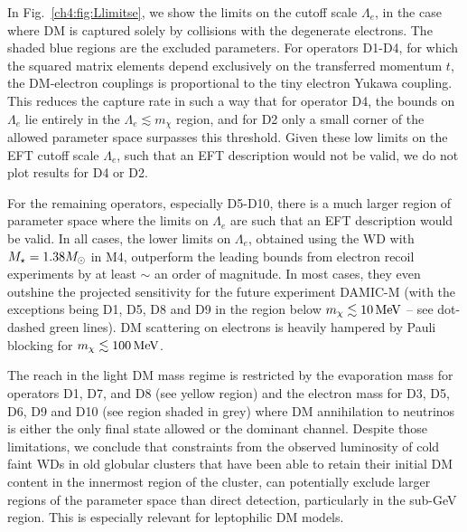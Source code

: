 In Fig.~\ref{ch4:fig:Llimitse}, we show the limits on the cutoff scale $\Lambda_e$, in the case where DM is captured solely by collisions with the degenerate electrons. The shaded blue regions are the excluded parameters.
For operators D1-D4, for which the squared matrix elements
depend exclusively on the transferred momentum $t$, the DM-electron couplings is proportional to the tiny electron Yukawa coupling. 
This reduces the capture rate in such a way that for operator D4, the bounds on $\Lambda_e$ lie entirely in the $\Lambda_e \lesssim m_\chi$ region, and for D2 only a small corner of the allowed parameter space surpasses this threshold. Given these low limits on the EFT cutoff scale $\Lambda_e$, such that an EFT description would not be valid, we do not plot results for D4 or D2.

For the remaining operators, especially D5-D10, there is a much larger region of parameter space where the limits on $\Lambda_e$ are such that an EFT description would be valid. In all cases, the lower limits on $\Lambda_e$, obtained using the WD with $M_\star=1.38M_\odot$ in M4, outperform the leading bounds from electron recoil experiments by at least $\sim$ an order of magnitude.  In most cases, they even outshine the projected sensitivity for the future experiment DAMIC-M (with the exceptions being D1, D5, D8 and D9 in the region below $m_\chi\lesssim10{\rm \,MeV}$ -- see dot-dashed green lines). DM scattering on electrons
is heavily hampered by Pauli blocking for  $m_\chi\lesssim100{\rm \,MeV}$.  

The reach in the light DM mass regime is restricted by the evaporation mass for operators D1, D7, and D8 (see yellow region) and the electron mass for D3, D5, D6, D9 and D10 (see region shaded in grey) where DM annihilation to neutrinos is either the only final state allowed or the dominant channel.  Despite those limitations, we conclude that constraints from the observed luminosity of cold faint WDs in old globular clusters that have been able to retain their initial DM content in the innermost region of the cluster, can potentially exclude larger regions of the parameter space than direct detection, particularly in the sub-GeV region. This is especially relevant for leptophilic DM models.

